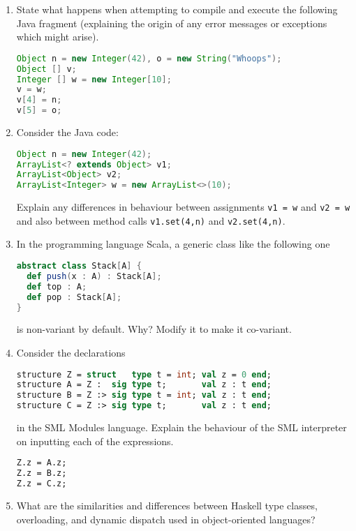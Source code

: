 \documentclass[10pt,\jkfside,a4paper]{article}
\begin{document}
\begin{enumerate}
\item State what happens when attempting to compile and execute the
following Java fragment (explaining the origin of any error messages or
exceptions which might arise).

\begin{lstlisting}[language=java]
Object n = new Integer(42), o = new String("Whoops");
Object [] v;
Integer [] w = new Integer[10];
v = w;
v[4] = n;
v[5] = o;
\end{lstlisting}


\item Consider the Java code:
\begin{lstlisting}[language=java]
Object n = new Integer(42);
ArrayList<? extends Object> v1;
ArrayList<Object> v2;
ArrayList<Integer> w = new ArrayList<>(10);
\end{lstlisting}
Explain any differences in behaviour between assignments \texttt{v1 = w} and
\texttt{v2 = w} and also between method calls \texttt{v1.set(4,n)} and
\texttt{v2.set(4,n)}.


\item In the programming language Scala, a generic class like the following
one
\begin{lstlisting}[language=scala]
abstract class Stack[A] {
  def push(x : A) : Stack[A];
  def top : A;
  def pop : Stack[A];
}
\end{lstlisting}

is non-variant by default. Why? Modify it to make it co-variant.


\item Consider the declarations
\begin{lstlisting}[language=ml]
structure Z = struct   type t = int; val z = 0 end;
structure A = Z :  sig type t;       val z : t end;
structure B = Z :> sig type t = int; val z : t end;
structure C = Z :> sig type t;       val z : t end;
\end{lstlisting}
in the SML Modules language. Explain the behaviour of the SML interpreter
on inputting each of the expressions.


\begin{lstlisting}[language=ml]
Z.z = A.z;
Z.z = B.z;
Z.z = C.z;
\end{lstlisting}

\item What are the similarities and differences between Haskell type
classes, overloading, and dynamic dispatch used in object-oriented languages?


\end{enumerate}
\end{document}
